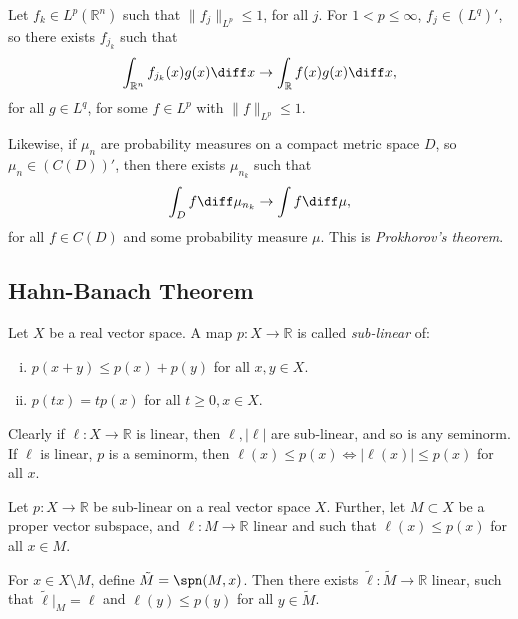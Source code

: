 \documentclass[12pt]{article}
\begin{document}
\begin{exbox}
	Let $f_k \in L^p(\mathbb{R}^n)$ such that $\|f_j\|_{L^p} \leq 1$, for all $j$. For $1 < p \leq \infty$, $f_j \in (L^q)'$, so there exists $f_{j_k}$ such that
	\[
	\int_{\mathbb{R}^n} f_{j_k}(x) g(x) \diff x \to \int_{\mathbb{R}}f(x) g(x) \diff x,
	\]
	for all $g \in L^q$, for some $f \in L^p$ with $\|f\|_{L^p} \leq 1$.

	Likewise, if $\mu_n$ are probability measures on a compact metric space $D$, so $\mu_n \in (C(D))'$, then there exists $\mu_{n_k}$ such that
	\[
	\int_D f \diff \mu_{n_k} \to \int f \diff \mu,
	\]
	for all $f \in C(D)$ and some probability measure $\mu$. This is \emph{Prokhorov's theorem}.
\end{exbox}


\subsection{Hahn-Banach Theorem}
\label{sub:hb_thm}

\begin{definition}
	Let $X$ be a real vector space. A map $p : X \to \mathbb{R}$ is called \emph{sub-linear} of:
	\begin{enumerate}[(i)]
		\item $p(x+y) \leq p(x) + p(y)$ for all  $x, y \in X$.
		\item $p(tx) = t p(x)$ for all $t \geq 0, x \in X$.
	\end{enumerate}
\end{definition}

\begin{remark}
	Clearly if $\ell : X \to \mathbb{R}$ is linear, then $\ell, |\ell|$ are sub-linear, and so is any seminorm. If $\ell $ is linear, $p$ is a seminorm, then $\ell(x) \leq p(x) \iff |\ell(x)| \leq p(x)$ for all $x$.
\end{remark}

\begin{lemma}
	Let $p : X \to \mathbb{R}$ be sub-linear on a real vector space $X$. Further, let $M \subset X$ be a proper vector subspace, and $\ell : M \to \mathbb{R}$ linear and such that $\ell(x) \leq p(x)$ for all $x \in M$.
	
	For $x \in X \setminus M$, define $\tilde M = \spn(M, x)$. Then there exists $\tilde \ell : \tilde M \to \mathbb{R}$ linear, such that $\tilde \ell|_M = \ell $ and $\ell(y) \leq p(y)$ for all $y \in \tilde M$.
\end{lemma}
\end{document}
